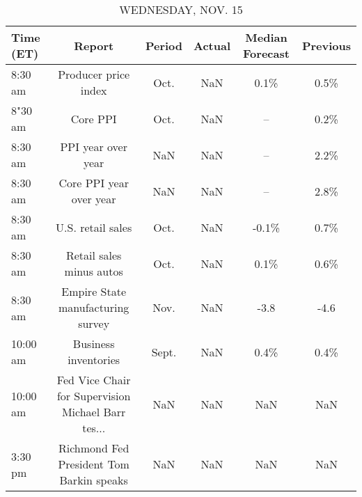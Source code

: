 \documentclass{article}%
\begin{document}
%


\begin{table}[htbp]%
\caption{WEDNESDAY, NOV. 15}%
\centering%
\begin{adjustbox}{width=1\textwidth}%
\begin{tabular}{lccccc}
\toprule
Time (ET) &                                             Report & Period & Actual & Median Forecast & Previous \\
\midrule
  8:30 am &                               Producer price index &   Oct. &    NaN &            0.1\% &     0.5\% \\
  8"30 am &                                           Core PPI &   Oct. &    NaN &              -- &     0.2\% \\
  8:30 am &                                 PPI year over year &    NaN &    NaN &              -- &     2.2\% \\
  8:30 am &                            Core PPI year over year &    NaN &    NaN &              -- &     2.8\% \\
  8:30 am &                                  U.S. retail sales &   Oct. &    NaN &           -0.1\% &     0.7\% \\
  8:30 am &                           Retail sales minus autos &   Oct. &    NaN &            0.1\% &     0.6\% \\
  8:30 am &                  Empire State manufacturing survey &   Nov. &    NaN &            -3.8 &     -4.6 \\
 10:00 am &                               Business inventories &  Sept. &    NaN &            0.4\% &     0.4\% \\
 10:00 am & Fed Vice Chair for Supervision Michael Barr tes... &    NaN &    NaN &             NaN &      NaN \\
  3:30 pm &           Richmond Fed President Tom Barkin speaks &    NaN &    NaN &             NaN &      NaN \\
\bottomrule
\end{tabular}
%
\end{adjustbox}%
\end{table}

%
\end{document}
